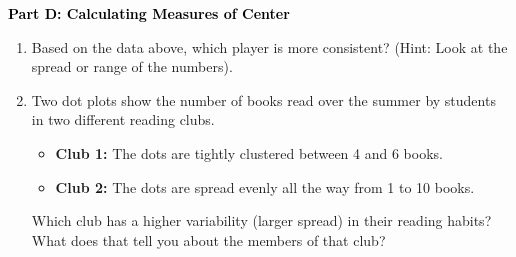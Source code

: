 \documentclass[12pt, letterpaper, fleqn]{article}
\begin{document}
\newpage

\begin{tcolorbox}[colback=customteal!20]
\large\textcolor{black}{\textbf{Part D: Calculating Measures of Center}}
\end{tcolorbox}

\vspace{3mm}

\begin{enumerate}[itemsep=2.5cm, leftmargin=0.6cm, resume]
\item Based on the data above, which player is more consistent? (Hint: Look at the spread or range of the numbers).
\item Two dot plots show the number of books read over the summer by students in two different reading clubs. 
\begin{itemize}
\item \textbf{Club 1:} The dots are tightly clustered between 4 and 6 books.
\item \textbf{Club 2:} The dots are spread evenly all the way from 1 to 10 books.
\end{itemize}
Which club has a higher variability (larger spread) in their reading habits? What does that tell you about the members of that club?
\end{enumerate}
\end{document}
